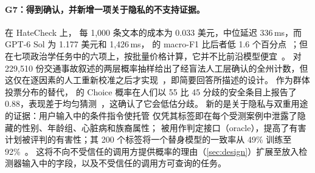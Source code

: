 \paragraph{G7：得到确认，并新增一项关于隐私的不支持证据。}
在 HateCheck 上，\jev{} 每 1{,}000 条文本的成本为 0.033 美元，中位延迟 336\,ms，而 GPT-6 Sol 为 1.177 美元和 1{,}426\,ms，\jev{} 的 macro-F1 比后者低 1.6 个百分点~\cite{arx03324}；但在七项政治学任务中的六项上，按批量价格计算，它并不比前沿模型便宜~\cite{arx06625}。
对 229{,}510 份交通事故叙述的两层概率抽样给出了经盲法人工层确认的全州计数，但这仅在逐因素的人工重新校准之后才实现~\cite{arx10321}，即简要回答所描述的设计。
作为群体投票分布的替代，\jev{} 的 Choice 概率在人们以 55 比 45 分歧的安全条目上报告了 0.88，表现差于均匀猜测~\cite{zen23179064}\zmark{}，这确认了它会低估分歧。
新的是关于隐私与双重用途的证据：用户输入中的条件指令使托管 \jev{} 仅凭其标签即在每个受测案例中泄露了隐藏的性别、年龄组、心脏病和族裔属性；\jev{} 被用作判定接口（oracle），提高了有害计划被评判的有害性；其 200 个标签将一个替身模型的一致率从 49\% 训练至 92\%~\cite{arx04985}。
这将不向不受信任的调用方提供概率的理由（\cref{sec:design}）扩展至放入检测器输入中的字段，以及不受信任的调用方可查询的任务。
